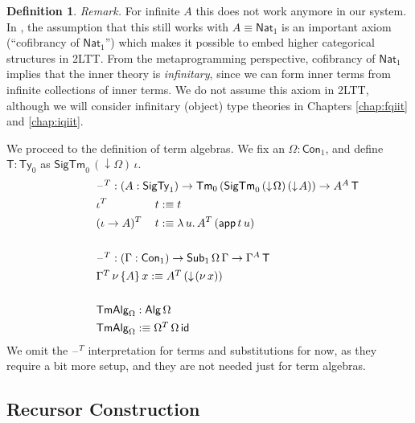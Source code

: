 \documentclass[12pt,a4paper,twoside,openany]{book}
\theoremstyle{remark}
\theoremstyle{definition}
\newtheorem{mydefinition}{Definition}
\theoremstyle{theorem}
\newcommand{\ms}[1]{\mathsf{#1}}
\newcommand{\id}{\mathsf{id}}
\newcommand{\Con}{\mathsf{Con}}
\newcommand{\Sub}{\mathsf{Sub}}
\newcommand{\Tm}{\mathsf{Tm}}
\newcommand{\Ty}{\mathsf{Ty}}
\newcommand{\blank}{\mathord{\hspace{1pt}\text{--}\hspace{1pt}}}
\newcommand{\SigTy}{\mathsf{SigTy}}
\newcommand{\SigTm}{\mathsf{SigTm}}
\newcommand{\app}{\ms{app}}
\newcommand{\Alg}{\ms{Alg}}
\newcommand{\TmAlg}{\ms{TmAlg}}
\newcommand{\Nat}{\ms{Nat}}
\newcommand{\down}{\downarrow}
\newcommand{\defn}{:\equiv}
\begin{document}
\begin{mydefinition}
\emph{Remark.} For infinite $A$ this does not work anymore in our system. In
\cite{twolevel}, the assumption that this still works with $A \equiv \Nat_1$ is
an important axiom (``cofibrancy of $\Nat_1$'') which makes it possible to embed
higher categorical structures in 2LTT. From the metaprogramming perspective,
cofibrancy of $\Nat_1$ implies that the inner theory is \emph{infinitary}, since
we can form inner terms from infinite collections of inner terms. We do not
assume this axiom in 2LTT, although we will consider infinitary (object) type
theories in Chapters \ref{chap:fqiit} and \ref{chap:iqiit}.
\end{mydefinition}

\noindent
We proceed to the definition of term algebras. We fix an $\Omega : \Con_1$, and
define $\ms{T} : \Ty_0$ as $\SigTm_0\,(\down\!\Omega)\,\iota$.
\begingroup
\allowdisplaybreaks
\begin{alignat*}{3}
  & \hspace{-5em}\rlap{$\blank^T : (A : \SigTy_1) \to \Tm_0\,(\SigTm_0\,(\down\!\Omega)\,(\down\!A)) \to A^A\,\ms{T}$} \\
  & \hspace{-5em}\iota^T\,&&t \defn t \\
  & \hspace{-5em}(\iota\to A)^T\,&&t \defn \lambda\,u.\,A^T\,(\app\,t\,u)\\
  & \hspace{-5em}&&\\
  & \hspace{-5em}\rlap{$\blank^T : (\Gamma : \Con_1) \to \Sub_1\,\Omega\,\Gamma \to \Gamma^A\,\ms{T}$}\\
  & \hspace{-5em}\rlap{$\Gamma^T\,\nu\,\{A\}\,x \defn A^T\,(\down\!(\nu\,x))$}\\
  & \hspace{-5em} && \\
  & \hspace{-5em}\rlap{$\TmAlg_{\Omega} : \Alg\,\Omega$}\\
  & \hspace{-5em}\rlap{$\TmAlg_{\Omega} \defn \Omega^T\,\Omega\,\id$}
\end{alignat*}
\endgroup
We omit the $\blank^T$ interpretation for terms and substitutions for now, as
they require a bit more setup, and they are not needed just for term algebras.

\subsection{Recursor Construction}
\end{document}
